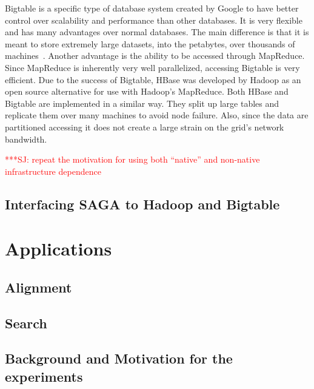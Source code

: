 \documentclass[conference,final]{IEEEtran}
\newcommand{\jhanote}[1]{ {\textcolor{red} { ***SJ: #1 }}}
\newcommand{\jhanote}[1]{}
\begin{document}
Bigtable is a specific type of database system created by Google to
have better control over scalability and performance than other
databases.  It is very flexible and has many advantages over normal
databases.  The main difference is that it is meant to store extremely
large datasets, into the petabytes, over thousands of
machines~\cite{bigtable}.  Another advantage is the ability to be
accessed through MapReduce.  Since MapReduce is inherently very well
parallelized, accessing Bigtable is very efficient.  Due to the
success of Bigtable, HBase was developed by Hadoop as an open source
alternative for use with Hadoop's MapReduce.  Both HBase and Bigtable
are implemented in a similar way.  They split up large tables and
replicate them over many machines to avoid node failure.  Also, since
the data are partitioned accessing it does not create a large strain
on the grid's network bandwidth.


\jhanote{repeat the motivation for using both ``native'' and
  non-native infrastructure dependence}

\subsection*{Interfacing SAGA to Hadoop and Bigtable}


\section{Applications}

\subsection*{Alignment}

\subsection*{Search}



\subsection*{Background and Motivation for the experiments}
\end{document}
